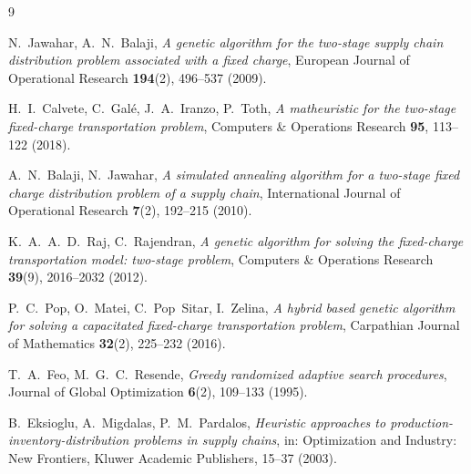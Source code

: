 \documentclass[12pt,a4paper]{article}
\begin{document}
\begin{thebibliography}{9}

N.~Jawahar, A.~N.~Balaji,
\textit{A genetic algorithm for the two-stage supply chain distribution
problem associated with a fixed charge},
European Journal of Operational Research \textbf{194}(2), 496--537 (2009).

H.~I.~Calvete, C.~Gal\'e, J.~A.~Iranzo, P.~Toth,
\textit{A matheuristic for the two-stage fixed-charge transportation problem},
Computers \& Operations Research \textbf{95}, 113--122 (2018).

A.~N.~Balaji, N.~Jawahar,
\textit{A simulated annealing algorithm for a two-stage fixed charge
distribution problem of a supply chain},
International Journal of Operational Research \textbf{7}(2), 192--215 (2010).

K.~A.~A.~D.~Raj, C.~Rajendran,
\textit{A genetic algorithm for solving the fixed-charge transportation model:
two-stage problem},
Computers \& Operations Research \textbf{39}(9), 2016--2032 (2012).

P.~C.~Pop, O.~Matei, C.~Pop~Sitar, I.~Zelina,
\textit{A hybrid based genetic algorithm for solving a capacitated fixed-charge
transportation problem},
Carpathian Journal of Mathematics \textbf{32}(2), 225--232 (2016).

T.~A.~Feo, M.~G.~C.~Resende,
\textit{Greedy randomized adaptive search procedures},
Journal of Global Optimization \textbf{6}(2), 109--133 (1995).

B.~Eksioglu, A.~Migdalas, P.~M.~Pardalos,
\textit{Heuristic approaches to production-inventory-distribution problems in
supply chains},
in: Optimization and Industry: New Frontiers, Kluwer Academic Publishers,
15--37 (2003).

\end{thebibliography}
\end{document}
